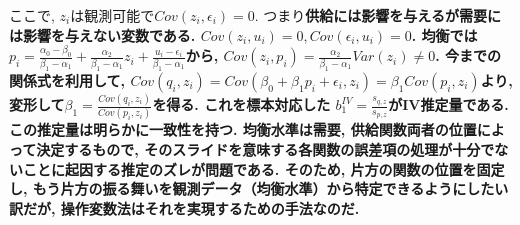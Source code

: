\documentclass[paper=a4paper,fontsize=10pt]{jlreq}
\begin{document}
ここで, $z_i$は観測可能で$Cov(z_i, \epsilon_i) = 0$. つまり\rmfamily\mcfamily\bfseries{供給には影響を与えるが需要には影響を与えない変数}\mdseries である. $Cov(z_i, u_i) = 0, Cov(\epsilon_i, u_i) = 0$. 均衡では$p_i = \frac{\alpha_0 - \beta_0}{\beta_1 - \alpha_1} + \frac{\alpha_2}{\beta_1 - \alpha_1} z_i + \frac{u_i - \epsilon_i}{\beta_1 - \alpha_1}$から, $Cov(z_i, p_i) = \frac{\alpha_2}{\beta_1 - \alpha_1}Var(z_i) \neq 0$. 今までの関係式を利用して, $Cov(q_i, z_i) = Cov(\beta_0 + \beta_1 p_i + \epsilon_i, z_i) = \beta_1 Cov(p_i, z_i)$より, 変形して$\beta_1 = \frac{Cov(q_i, z_i)}{Cov(p_i, z_i)}$を得る. これを標本対応した $b_1^{IV} = \frac{s_{q,z}}{s_{p,z}}$が\rmfamily\mcfamily\bfseries{IV推定量}\mdseries である. この推定量は明らかに\rmfamily\mcfamily\bfseries{一致性を持つ}\mdseries . 均衡水準は需要, 供給関数両者の位置によって決定するもので, そのスライドを意味する各関数の誤差項の処理が十分でないことに起因する推定のズレが問題である. そのため, \rmfamily\mcfamily\bfseries{片方の関数の位置を固定し, もう片方の振る舞いを観測データ（均衡水準）から特定できるようにしたい}\mdseries 訳だが, 操作変数法はそれを実現するための手法なのだ.\\
\end{document}
